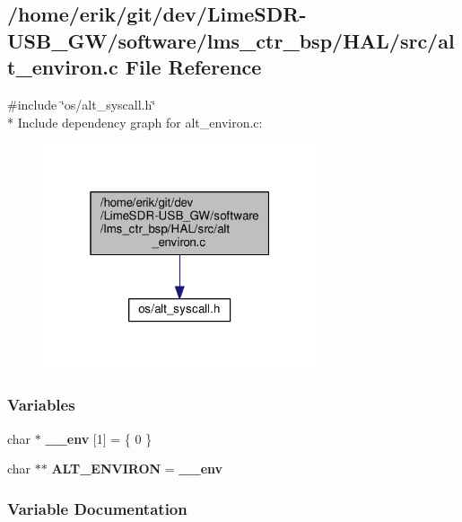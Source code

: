 \subsection{/home/erik/git/dev/\+Lime\+S\+D\+R-\/\+U\+S\+B\+\_\+\+G\+W/software/lms\+\_\+ctr\+\_\+bsp/\+H\+A\+L/src/alt\+\_\+environ.c File Reference}
\label{alt__environ_8c}
{\ttfamily \#include \char`\"{}os/alt\+\_\+syscall.\+h\char`\"{}}\\*
Include dependency graph for alt\+\_\+environ.\+c\+:
\nopagebreak
\begin{figure}[H]
\begin{center}
\leavevmode
\includegraphics[width=229pt]{d3/d7a/alt__environ_8c__incl}
\end{center}
\end{figure}
\subsubsection*{Variables}
\begin{DoxyCompactItemize}
\item 
char $\ast$ {\bf \+\_\+\+\_\+env} [1] = \{ 0 \}
\item 
char $\ast$$\ast$ {\bf A\+L\+T\+\_\+\+E\+N\+V\+I\+R\+ON} = {\bf \+\_\+\+\_\+env}
\end{DoxyCompactItemize}


\subsubsection{Variable Documentation}
